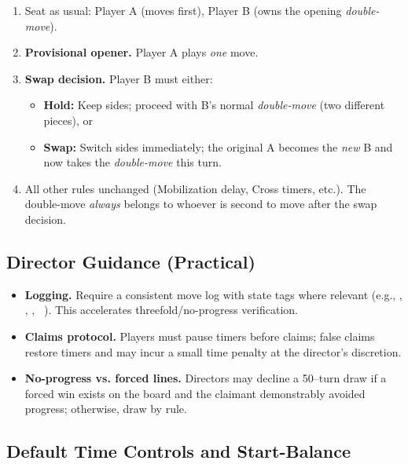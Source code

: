 \documentclass[11pt]{article}
\newcommand{\CC}[1]{\textcolor{blue!60!black}{\scriptsize\ttfamily[CF:#1]}}
\newcommand{\SC}[1]{\textcolor{red!60!black}{\scriptsize\ttfamily[S:#1]}}
\newcommand{\RoC}{\textcolor{teal!60!black}{\scriptsize\ttfamily[Rooted]}}
\newcommand{\RC}{\textcolor{purple!70!black}{\scriptsize\ttfamily[RC]}}
\renewcommand{\RC}[1][]{%
  \textcolor{purple!70!black}{\scriptsize\ttfamily[RC%
  \if\relax\detokenize{#1}\relax\else~#1\fi]}}
\begin{document}
\begin{rulevariant}[title={Pie Rule (Tournament Variant)}]
\begin{enumerate}\itemsep0.25em
  \item Seat as usual: Player A (moves first), Player B (owns the opening \emph{double-move}).
  \item \textbf{Provisional opener.} Player A plays \emph{one} move.
  \item \textbf{Swap decision.} Player B must either:
  \begin{itemize}\itemsep=0.2em
    \item \textbf{Hold:} Keep sides; proceed with B's normal \emph{double-move} (two different pieces), or
    \item \textbf{Swap:} Switch sides immediately; the original A becomes the \emph{new} B and now takes the \emph{double-move} this turn.
  \end{itemize}
  \item All other rules unchanged (Mobilization delay, Cross timers, etc.). The double-move \emph{always} belongs to whoever is second to move after the swap decision.
\end{enumerate}
\end{rulevariant}

\medskip
\subsection{Director Guidance (Practical)}

\begin{itemize}[leftmargin=1.3em,itemsep=0.2em]
  \item \textbf{Logging.} Require a consistent move log with state tags where relevant (e.g., \texttt{\RoC}, \texttt{\CC{in 1/3}}, \texttt{\SC{H}}, \texttt{\RC[3/5]}). This accelerates threefold/no-progress verification.
  \item \textbf{Claims protocol.} Players must pause timers  before claims; false claims restore timers  and may incur a small time penalty at the director's discretion.
  \item \textbf{No-progress vs. forced lines.} Directors may decline a 50--turn draw if a forced win exists on the board and the claimant demonstrably avoided progress; otherwise, draw by rule.
\end{itemize}

\subsection{Default Time Controls and Start-Balance}
\label{subsec:time_defaults}
\end{document}

